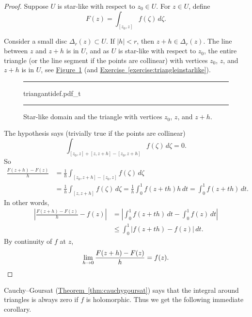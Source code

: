 \documentclass[12pt,openany]{book}
\newcommand{\sabs}[1]{\lvert {#1} \rvert}
\newcommand{\abs}[1]{\left\lvert {#1} \right\rvert}
\theoremstyle{plain}
\theoremstyle{remark}
\theoremstyle{definition}
\newenvironment{myfig}{%
\begin{figure}[h!t]
\noindent\rule{\textwidth}{0.5pt}\vspace{12pt}\par\centering}%
{\par\noindent\rule{\textwidth}{0.5pt}
\end{figure}}
\theoremstyle{exercise}
\theoremstyle{example}
\newcommand{\figureref}[1]{\hyperref[#1]{Figure~\ref*{#1}}}
\newcommand{\exerciseref}[1]{\hyperref[#1]{Exercise~\ref*{#1}}}
\newcommand{\thmref}[1]{\hyperref[#1]{Theorem~\ref*{#1}}}
\begin{document}
\begin{proof}
Suppose $U$ is star-like with respect to $z_0 \in U$.
For $z \in U$, define
\begin{equation*}
F(z) = \int_{[z_0,z]} f(\zeta) \, d\zeta .
\end{equation*}

Consider a small disc $\Delta_r(z) \subset U$.
If $\sabs{h} < r$, then
$z+h \in \Delta_r(z)$.
The line between $z$ and $z+h$ is in $U$, and
as $U$ is star-like with respect to $z_0$, 
the entire triangle (or the line segment if the points are collinear)
with vertices $z_0$, $z$, and $z+h$
is in $U$, see \figureref{fig:triangantidef}
(and \exerciseref{exercise:triangleinstarlike}).
\begin{myfig}
{triangantidef.pdf_t}
\caption{Star-like domain and the triangle with vertices
$z_0$, $z$, and $z+h$.\label{fig:triangantidef}}
\end{myfig}

The hypothesis says (trivially true if the points are collinear)
\begin{equation*}
\int_{[z_0,z]+[z,z+h]-[z_0,z+h]} f(\zeta) \, d\zeta = 0 .
\end{equation*}
So
\begin{equation*}
\begin{split}
\frac{F(z+h)-F(z)}{h} &=
\frac{1}{h}
\int_{[z_0,z+h]-[z_0,z]} f(\zeta) \, d\zeta
\\
& =
\frac{1}{h}
\int_{[z,z+h]} f(\zeta) \, d\zeta
=
\frac{1}{h}
\int_0^1 f(z+th) h \, dt
=
\int_0^1 f(z+th) \, dt .
\end{split}
\end{equation*}
In other words,
\begin{equation*}
\begin{split}
\abs{
\frac{F(z+h)-F(z)}{h} 
-
f(z)
}
& =
\abs{
\int_0^1 f(z+th) \, dt
-
\int_0^1 f(z) \, dt
}
\\
& \leq
\int_0^1 \abs{f(z+th)-f(z)} \, dt .
\end{split}
\end{equation*}
By continuity of $f$ at $z$,
\begin{equation*}
\lim_{h \to 0}
\frac{F(z+h)-F(z)}{h} 
=
f(z) . \qedhere
\end{equation*}
\end{proof}

Cauchy--Goursat (\thmref{thm:cauchygoursat}) says that the integral around
triangles is always zero if $f$ is holomorphic.  Thus we get
the following immediate corollary.
\end{document}

